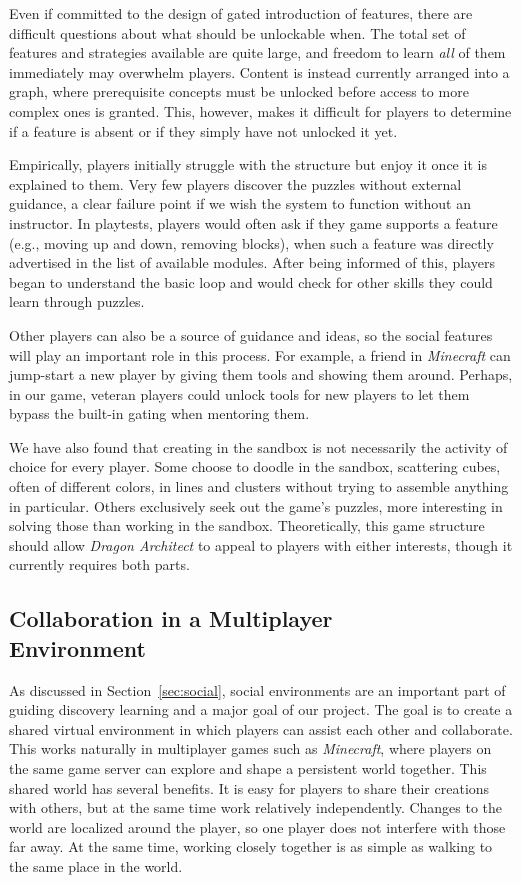 \documentclass{sig-alternate}
\newcommand{\gametitle}{{\emph{Dragon Architect}}}
\begin{document}
Even if committed to the design of gated introduction of features, there are difficult questions about what should be unlockable when.
The total set of features and strategies available are quite large, and freedom to learn \emph{all} of them immediately may overwhelm players.
Content is instead currently arranged into a graph, where prerequisite concepts must be unlocked before access to more complex ones is granted.
This, however, makes it difficult for players to determine if a feature is absent or if they simply have not unlocked it yet.

Empirically, players initially struggle with the structure but enjoy it once it is explained to them.
Very few players discover the puzzles without external guidance, a clear failure point if we wish the system to function without an instructor.
In playtests, players would often ask if they game supports a feature (e.g., moving up and down, removing blocks), when such a feature was directly advertised in the list of available modules.
After being informed of this, players began to understand the basic loop and would check for other skills they could learn through puzzles.

Other players can also be a source of guidance and ideas, so the social features will play an important role in this process.
For example, a friend in \emph{Minecraft} can jump-start a new player by giving them tools and showing them around.
Perhaps, in our game, veteran players could unlock tools for new players to let them bypass the built-in gating when mentoring them.

We have also found that creating in the sandbox is not necessarily the activity of choice for every player. 
Some choose to doodle in the sandbox, scattering cubes, often of different colors, in lines and clusters without trying to assemble anything in particular.
Others exclusively seek out the game's puzzles, more interesting in solving those than working in the sandbox.
Theoretically, this game structure should allow \gametitle{} to appeal to players with either interests, though it currently requires both parts.

\subsection{Collaboration in a Multiplayer\\Environment}
\label{sec:multiplayer}

As discussed in Section~\ref{sec:social}, social environments are an important part of guiding discovery learning and a major goal of our project.
The goal is to create a shared virtual environment in which players can assist each other and collaborate.
This works naturally in multiplayer games such as \emph{Minecraft}, where players on the same game server can explore and shape a persistent world together.
This shared world has several benefits.
It is easy for players to share their creations with others, but at the same time work relatively independently.
Changes to the world are localized around the player, so one player does not interfere with those far away.
At the same time, working closely together is as simple as walking to the same place in the world.
\end{document}
